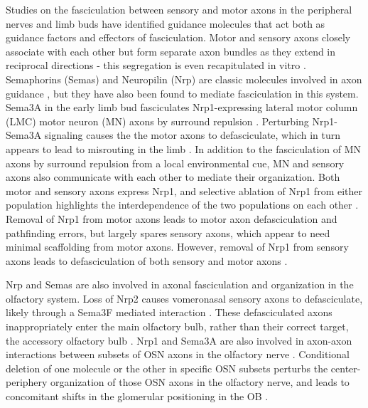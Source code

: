 Studies on the fasciculation between sensory and motor axons in the peripheral nerves and limb buds have identified guidance molecules that act both as guidance factors and effectors of fasciculation.
Motor and sensory axons closely associate with each other but form separate axon bundles as they extend in reciprocal directions - this segregation is even recapitulated in vitro \cite{gallarda2008segregation}.
Semaphorins (Semas) and Neuropilin (Nrp) are classic molecules involved in axon guidance \cite{bashaw2010signaling,kolodkin2011mechanisms}, but they have also been found to mediate fasciculation in this system.
Sema3A in the early limb bud fasciculates Nrp1-expressing lateral motor column (LMC) motor neuron (MN) axons by surround repulsion \cite{huber2005distinct}.
Perturbing Nrp1-Sema3A signaling causes the the motor axons to defasciculate, which in turn appears to lead to misrouting in the limb \cite{huber2005distinct}.
In addition to the fasciculation of MN axons by surround repulsion from a local environmental cue, MN and sensory axons also communicate with each other to mediate their organization.
Both motor and sensory axons express Nrp1, and selective ablation of Nrp1 from either population highlights the interdependence of the two populations on each other \cite{huettl2011npn}.
Removal of Nrp1 from motor axons leads to motor axon defasciculation and pathfinding errors, but largely spares sensory axons, which appear to need minimal scaffolding from motor axons.
However, removal of Nrp1 from sensory axons leads to defasciculation of both sensory and motor axons \cite{huettl2011npn}.

Nrp and Semas are also involved in axonal fasciculation and organization in the olfactory system.
Loss of Nrp2 causes vomeronasal sensory axons to defasciculate, likely through a Sema3F mediated interaction \cite{cloutier2002neuropilin}.
These defasciculated axons inappropriately enter the main olfactory bulb, rather than their correct target, the accessory olfactory bulb \cite{cloutier2002neuropilin}.
Nrp1 and Sema3A are also involved in axon-axon interactions between subsets of OSN axons in the olfactory nerve \cite{imai2009pre}.
Conditional deletion of one molecule or the other in specific OSN subsets perturbs the center-periphery organization of those OSN axons in the olfactory nerve, and leads to concomitant shifts in the glomerular positioning in the OB \cite{imai2009pre}.

